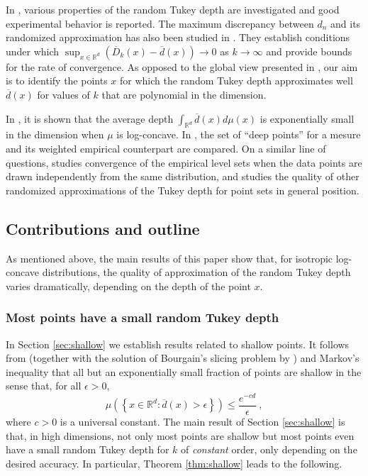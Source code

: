 \documentclass[12pt]{article}
\newcommand{\R}{\mathbb{R}}
\newcommand{\ol}{\overline}
\begin{document}
In \cite{cuesta2008random}, various properties of the random Tukey depth are investigated and  good experimental behavior is reported.
The maximum discrepancy between $d_n$ and its randomized approximation has also been studied in \cite{MR4165498}. They establish conditions under which $\sup_{x\in \R^d} \left(\ol{D}_k(x)- \ol{d}(x)\right) \to 0$
as $k\to \infty$ and provide bounds for the rate of convergence. As opposed to the global view
presented in \cite{MR4165498}, our aim is to identify the points $x$ for which the random Tukey depth approximates
well $\ol{d}(x)$ for values of $k$ that are polynomial in the dimension. 

In \cite{Brazitikos22halfspacedepth}, it is shown that the average depth $\int _{\R^d}\ol{d}(x) d\mu(x)$ is exponentially
small in the dimension when $\mu$ is log-concave. In \cite{ilienko2025strong}, the set of ``deep points'' for a mesure and its weighted empirical counterpart are compared. On a similar line of questions, \cite{brunel2019concentration} studies convergence of the empirical level sets 
when the data points are drawn independently from the same distribution, and \cite{ChMoWa13} studies the quality of other randomized approximations of the Tukey depth
for point sets in general position. 



 
\subsection{Contributions and outline}

As mentioned above, the main results of this paper show that, for isotropic log-concave
distributions, the quality of approximation of the random Tukey depth varies dramatically,
depending on the depth of the point $x$. 

\subsubsection*{Most points have a small random Tukey depth}
In Section \ref{sec:shallow} we establish results related to shallow points. 
It follows from \cite[Theorem 1.1]{Brazitikos22halfspacedepth}
(together with the solution of Bourgain's slicing problem by \cite{KlLe24})
and Markov's inequality
that all but an exponentially small fraction of points are shallow in the sense that, for all $\epsilon>0$,
\[
   \mu\left( \left\{x\in \R^d: \ol{d}(x) > \epsilon \right\} \right) \le \frac{e^{-cd}}{\epsilon}~,
 \]
 where $c>0$ is a universal constant. The main result of Section \ref{sec:shallow} is that, in high dimensions,
 not only most points are shallow but most points even have a small random Tukey depth for $k$
 of \emph{constant} order, only depending on the desired accuracy. In particular, Theorem \ref{thm:shallow}  leads to the following.
\end{document}
